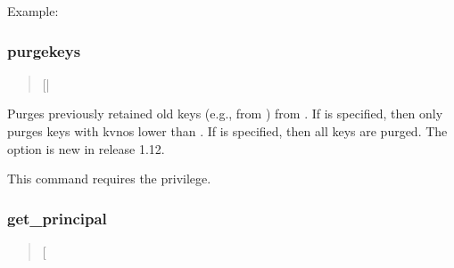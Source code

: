 \documentclass[letterpaper,10pt,english]{sphinxmanual}
\begin{document}
\sphinxAtStartPar
Example:

\begin{sphinxVerbatim}[commandchars=\\\{\}]
  
    
    
   
\end{sphinxVerbatim}


\subsubsection{purgekeys}
\label{\detokenize{admin/admin_commands/kadmin_local:purgekeys}}\label{\detokenize{admin/admin_commands/kadmin_local:id6}}\begin{quote}

\sphinxAtStartPar
{} {[}| \sphinxstyleemphasis{oldest\_kvno\_to\_keep}{]} 
\end{quote}

\sphinxAtStartPar
Purges previously retained old keys (e.g., from ) from .  If  is specified, then
only purges keys with kvnos lower than .  If
 is specified, then all keys are purged.  The  option
is new in release 1.12.

\sphinxAtStartPar
This command requires the  privilege.


\subsubsection{get\_principal}
\label{\detokenize{admin/admin_commands/kadmin_local:get-principal}}\label{\detokenize{admin/admin_commands/kadmin_local:id7}}\begin{quote}

\sphinxAtStartPar
{} {[}\sphinxstylestrong{\sphinxhyphen{}terse}{]} 
\end{quote}
\end{document}
